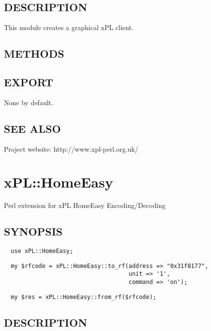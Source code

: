 \documentclass[12pt,a4paper]{article}
\begin{document}
\subsection*{DESCRIPTION\label{xPL::Gtk2Client_DESCRIPTION}}


This module creates a graphical xPL client.

\subsection*{METHODS\label{xPL::Gtk2Client_METHODS}}
\subsection*{EXPORT\label{xPL::Gtk2Client_EXPORT}}


None by default.

\subsection*{SEE ALSO\label{xPL::Gtk2Client_SEE_ALSO}}


Project website: http://www.xpl-perl.org.uk/

\newpage
\section{xPL::HomeEasy\label{xPL::HomeEasy}}


Perl extension for xPL HomeEasy Encoding/Decoding

\subsection*{SYNOPSIS\label{xPL::HomeEasy_SYNOPSIS}}
\begin{verbatim}
  use xPL::HomeEasy;
\end{verbatim}
\begin{verbatim}
  my $rfcode = xPL::HomeEasy::to_rf(address => "0x31f8177",
                                    unit => '1',
                                    command => 'on');
\end{verbatim}
\begin{verbatim}
  my $res = xPL::HomeEasy::from_rf($rfcode);
\end{verbatim}
\subsection*{DESCRIPTION\label{xPL::HomeEasy_DESCRIPTION}}
\end{document}

